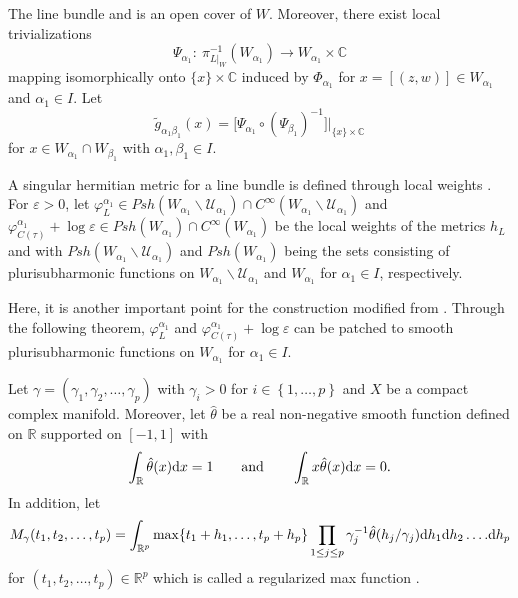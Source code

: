 \documentclass[10pt,a4paper]{amsart}
\numberwithin{equation}{section}
\def\operatorname#1{#1}
\begin{document}
The line bundle  and  is an open cover of $W$. Moreover, there exist local trivializations
\[
\Psi_{\alpha_1}\colon \ \pi^{-1}_{L|_W}(W_{\alpha_1})\rightarrow W_{\alpha_1} \times \mathbb{C}
\]
 mapping  isomorphically onto $\{ x \} \times \mathbb{C}$ induced by $\Phi_{\alpha_1}$ for $x=[(z,w)] \in W_{\alpha_1}$ and $\alpha_1 \in I$. Let
\[
\widetilde{g}_{\alpha_1 \beta_1}(x)=\big[\Psi_{\alpha_1} \circ (\Psi_{\beta_1})^{-1}\big]\big|_{\{ x \}\times \mathbb{C}}
\]
for $x \in W_{\alpha_1} \cap W_{\beta_1}$ with $\alpha_1,\beta_1 \in I$.

A singular hermitian metric for a line bundle is defined through local weights \cite[Definition~8.7]{Vincent-Ahmed}. For $\varepsilon > 0$, let
$
 \varphi^{\alpha_1}_L \in \operatorname{Psh}(W_{\alpha_1} \backslash \mathcal{U}_{\alpha_1})\cap C^\infty(W_{\alpha_1} \backslash \mathcal{U}_{\alpha_1})$ and $\varphi^{\alpha_1} _{C(\tau)}+\log \varepsilon \in \operatorname{Psh}(W_{\alpha_1}) \cap C^\infty (W_{\alpha_1})
$
be the local weights of the metrics $h_L$ and  with $\operatorname{Psh}(W_{\alpha_1} \backslash \mathcal{U}_{\alpha_1})$ and $\operatorname{Psh}(W_{\alpha_1})$ being the sets consisting of plurisubharmonic functions on $W_{\alpha_1} \backslash \mathcal{U}_{\alpha_1}$ and $W_{\alpha_1}$ for $\alpha_1 \in I$, respectively.

Here, it is another important point for the construction modified from \cite{Takayuki-Takato2}. Through the following theorem, $\varphi^{\alpha_1}_L$ and $\varphi^{\alpha_1}_{C(\tau)}+\log \varepsilon$ can be patched to smooth plurisubharmonic functions on $W_{\alpha_1}$ for $\alpha_1 \in I$.

Let $\gamma =(\gamma_1,\gamma_2,\dots ,\gamma_p)$ with $\gamma_i >0$ for $i \in \left \{ 1,\dots ,p\right \}$ and $X$ be a compact complex manifold. Moreover, let $\hat{\theta}$ be a real non-negative smooth function defined on $ \mathbb{R}$ supported on $[-1,1]$ with
\[
\int _\mathbb{R} \hat{\theta}(x){\rm d}x=1 \qquad \text{and} \qquad \int _\mathbb{R}x\hat{\theta} (x){\rm d}x=0.
\]
 In addition, let
\[
M_\gamma (t_1,t_2,\dots ,t_p)=\int _{\mathbb{R}^p}\max \{ t_1+h_1,\dots ,t_p+h_p\}\prod_{1 \leq j \leq p} \gamma^{-1}_j \hat{\theta} (h_j/\gamma_j) {\rm d}h_1 {\rm d}h_2 \dots .{\rm d} h_p
\]
for $(t_1,t_2,\dots ,t_p) \in \mathbb{R}^p$ which is called a regularized max function \cite{Alexandre}.
\end{document}
